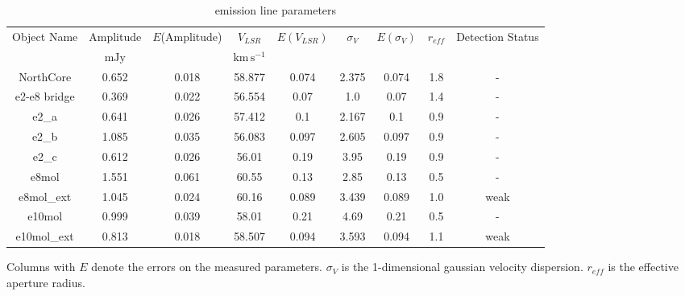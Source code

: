 \begin{table*}[htp]
\caption{\formaldehyde \twotwo emission line parameters}
\begin{tabular}{ccccccccc}
\label{tab:emission22}
Object Name & Amplitude & $E$(Amplitude) & $V_{LSR}$ & $E(V_{LSR})$ & $\sigma_V$ & $E(\sigma_V)$ & $r_{eff}$ & Detection Status \\
 & $\mathrm{mJy}$ &  & $\mathrm{km\,s^{-1}}$ &  &  &  &  &  \\
\hline
NorthCore & 0.652 & 0.018 & 58.877 & 0.074 & 2.375 & 0.074 & 1.8 & - \\
e2-e8 bridge & 0.369 & 0.022 & 56.554 & 0.07 & 1.0 & 0.07 & 1.4 & - \\
e2\_a & 0.641 & 0.026 & 57.412 & 0.1 & 2.167 & 0.1 & 0.9 & - \\
e2\_b & 1.085 & 0.035 & 56.083 & 0.097 & 2.605 & 0.097 & 0.9 & - \\
e2\_c & 0.612 & 0.026 & 56.01 & 0.19 & 3.95 & 0.19 & 0.9 & - \\
e8mol & 1.551 & 0.061 & 60.55 & 0.13 & 2.85 & 0.13 & 0.5 & - \\
e8mol\_ext & 1.045 & 0.024 & 60.16 & 0.089 & 3.439 & 0.089 & 1.0 & weak \\
e10mol & 0.999 & 0.039 & 58.01 & 0.21 & 4.69 & 0.21 & 0.5 & - \\
e10mol\_ext & 0.813 & 0.018 & 58.507 & 0.094 & 3.593 & 0.094 & 1.1 & weak \\
\hline
\end{tabular}
\par
Columns with $E$ denote the errors on the measured parameters.  $\sigma_{V}$ is the 1-dimensional gaussian velocity dispersion.  $r_{eff}$ is the effective aperture radius.
\end{table*}
